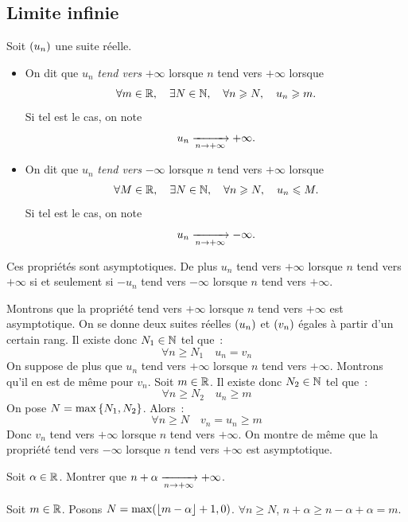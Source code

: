 \documentclass{magnoliaold}
\begin{document}
\subsection{Limite infinie}

\begin{definition}[utile=-3]
Soit $\left(u_n\right)$ une suite réelle.
\begin{itemize}
\item On dit que $u_n$ \emph{tend vers} $+\infty$ lorsque $n$ tend vers $+\infty$
  lorsque
  \[\forall m\in\mathbb{R} ,\quad \exists N\in\mathbb{N} ,\quad \forall n\geqslant N ,\quad
    u_n\geqslant m.\]
  Si tel est le cas, on note
  \[u_n \xrightarrow[n\rightarrow +\infty]{} +\infty.\]
\item On dit que $u_n$ \emph{tend vers} $-\infty$ lorsque $n$ tend vers $+\infty$
  lorsque
  \[\forall M\in\mathbb{R} ,\quad \exists N\in\mathbb{N} ,\quad \forall n\geqslant N ,\quad
    u_n\leqslant M.\]
  Si tel est le cas, on note
  \[u_n \xrightarrow[n\rightarrow +\infty]{} -\infty.\]
\end{itemize}
Ces propriétés sont asymptotiques. De plus $u_n$ tend vers $+\infty$ lorsque
$n$ tend vers $+\infty$ si et seulement si $-u_n$ tend vers $-\infty$ lorsque
$n$ tend vers $+\infty$.
\end{definition}

\begin{preuve}
Montrons que la propriété \og tend vers $+\infty$ lorsque $n$ tend vers
$+\infty$ \fg est asymptotique. On se donne deux suites réelles $\left(u_n\right)$ et
$\left(v_n\right)$ égales à partir d'un certain rang. Il existe donc $N_1\in\mathbb{N}$ tel
que~:
\[\forall n\geq N_1 \quad u_n=v_n\]
On suppose de plus que $u_n$ tend vers $+\infty$ lorsque $n$ tend vers
$+\infty$. Montrons qu'il en est de même pour $v_n$. Soit $m\in\mathbb{R}$. Il existe
donc $N_2\in\mathbb{N}$ tel que~:
\[\forall n\geq N_2 \quad u_n \geq m\]
On pose $N=\max\left\{N_1,N_2\right\}$. Alors~:
\[\forall n\geq N \quad v_n=u_n \geq m\]
Donc $v_n$ tend vers $+\infty$ lorsque $n$ tend vers $+\infty$. On montre
de même que la propriété \og tend vers $-\infty$ lorsque $n$ tend vers
$+\infty$ \fg est asymptotique.
\end{preuve}

\begin{exoUnique}
\exo Soit $\alpha\in\mathbb{R}$. Montrer que $n+\alpha\xrightarrow[n\rightarrow +\infty]{}+\infty$.
\end{exoUnique}

\begin{sol}
Soit $m\in \mathbb{R}$. Posons $N=\max(\left\lfloor m-\alpha\right\rfloor+1,0)$. $\forall n\geq N$, $n+\alpha\geq n-\alpha+\alpha=m$.
\end{sol}
\end{document}
